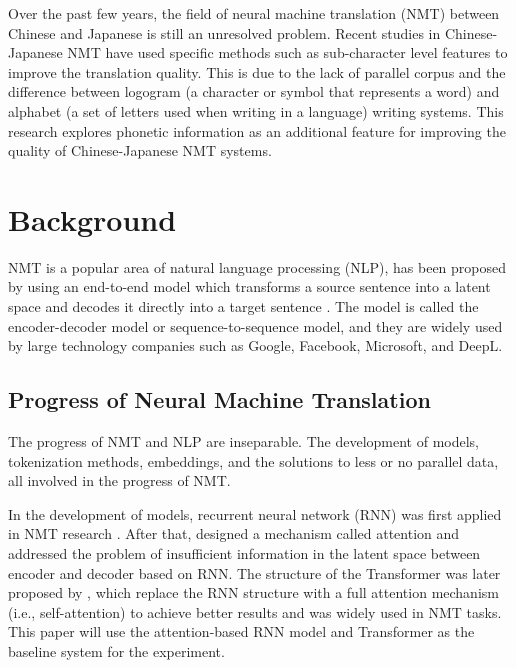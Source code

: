 \hspace{24pt}

Over the past few years, the field of neural machine translation (NMT) between Chinese and Japanese is still an unresolved problem. Recent studies in Chinese-Japanese NMT have used specific methods such as sub-character level features to improve the translation quality. This is due to the lack of parallel corpus and the difference between logogram (a character or symbol that represents a word) and alphabet (a set of letters used when writing in a language) writing systems. This research explores phonetic information as an additional feature for improving the quality of Chinese-Japanese NMT systems.

\section{Background} \label{sec:background}

NMT is a popular area of natural language processing (NLP), has been proposed by using an end-to-end model which transforms a source sentence into a latent space and decodes it directly into a target sentence \cite{sutskever2014sequence, cho2014learning}. The model is called the encoder-decoder model or sequence-to-sequence model, and they are widely used by large technology companies such as Google, Facebook, Microsoft, and DeepL.

\subsection{Progress of Neural Machine Translation} \label{sec:nmt}

The progress of NMT and NLP are inseparable. The development of models, tokenization methods, embeddings, and the solutions to less or no parallel data, all involved in the progress of NMT.

In the development of models, recurrent neural network (RNN) was first applied in NMT research \cite{sutskever2014sequence, cho2014learning}. After that, \cite{bahdanau2014neural} designed a mechanism called attention and addressed the problem of insufficient information in the latent space between encoder and decoder based on RNN. The structure of the Transformer was later proposed by \cite{NIPS2017_3f5ee243}, which replace the RNN structure with a full attention mechanism (i.e., self-attention) to achieve better results and was widely used in NMT tasks. This paper will use the attention-based RNN model and Transformer \cite{bahdanau2014neural,NIPS2017_3f5ee243} as the baseline system for the experiment.

